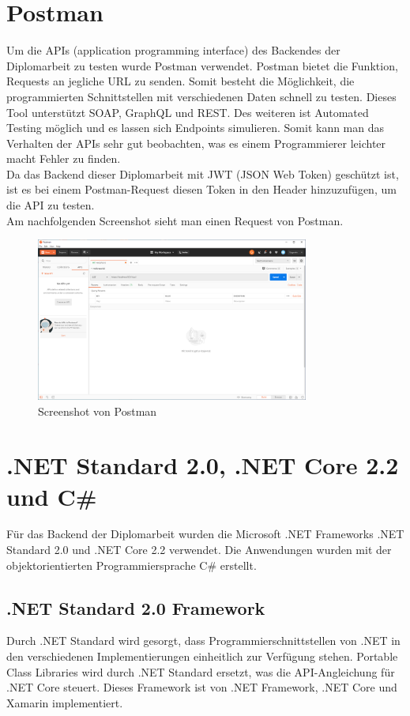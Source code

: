 \section{Postman}
Um die APIs (application programming interface) des Backendes der Diplomarbeit zu testen wurde Postman verwendet. Postman bietet die Funktion, Requests an jegliche URL zu senden. Somit besteht die Möglichkeit, die programmierten Schnittstellen mit verschiedenen Daten schnell zu testen. Dieses Tool unterstützt SOAP, GraphQL und REST. Des weiteren ist Automated Testing möglich und es lassen sich Endpoints simulieren. Somit kann man das Verhalten der APIs sehr gut beobachten, was es einem Programmierer leichter macht Fehler zu finden.\\
Da das Backend dieser Diplomarbeit mit JWT (JSON Web Token) geschützt ist, ist es bei einem Postman-Request diesen Token in den Header hinzuzufügen, um die API zu testen. \autocite{postmanDocs} \\
Am nachfolgenden Screenshot sieht man einen Request von Postman.
\begin{figure}[h]
	\centerline{
		\includegraphics[width=0.8\textwidth]{./grafiken/postman.png}
	}
	\vskip0pt
	\caption{Screenshot von Postman} \label{fig:postman}
\end{figure}

\section{.NET Standard 2.0, .NET Core 2.2 und C\#}
Für das Backend der Diplomarbeit wurden die Microsoft .NET Frameworks .NET Standard 2.0 und .NET Core 2.2 verwendet. Die Anwendungen wurden mit der objektorientierten Programmiersprache C\#  erstellt.
\subsection{.NET Standard 2.0 Framework}
Durch .NET Standard wird gesorgt, dass Programmierschnittstellen von .NET in den verschiedenen Implementierungen einheitlich zur Verfügung stehen. Portable Class Libraries wird durch .NET Standard ersetzt, was die API-Angleichung für .NET Core steuert. Dieses Framework ist von .NET Framework, .NET Core und Xamarin implementiert.

